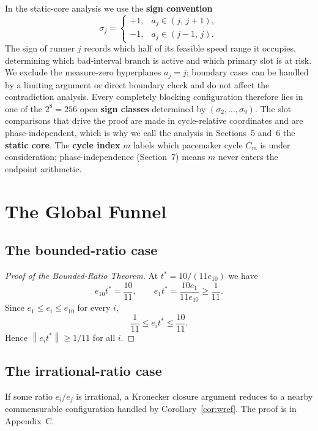 \documentclass[12pt,a4paper]{amsart}
\theoremstyle{definition}
\theoremstyle{remark}
\newcommand{\norm}[1]{\left\|#1\right\|}
\begin{document}
In the static-core analysis we use the \textbf{sign convention}
\[
  \sigma_j =
  \begin{cases}
    +1, & a_j\in(j,\,j+1),\\
    -1, & a_j\in(j-1,\,j).
  \end{cases}
\]
The sign of runner $j$ records which half of its feasible speed range it occupies,
determining which bad-interval branch is active and which primary slot is at risk.
We exclude the measure-zero hyperplanes $a_j=j$; boundary cases can be handled by a
limiting argument or direct boundary check and do not affect the contradiction analysis.
Every completely blocking configuration therefore lies in one of the $2^8=256$ open
\textbf{sign classes} determined by $(\sigma_2,\ldots,\sigma_9)$.
The slot comparisons that drive the proof are made in cycle-relative coordinates and are
phase-independent, which is why we call the analysis in Sections~5 and~6 the \textbf{static core}. The \textbf{cycle index} $m$ labels which pacemaker cycle $C_m$ is under consideration;
phase-independence (Section~7) means $m$ never enters the endpoint arithmetic.

\section{The Global Funnel}

\subsection{The bounded-ratio case}

\begin{proof}[Proof of the Bounded-Ratio Theorem]
At $t^*=10/(11e_{10})$ we have
\[
  e_{10}t^* = \frac{10}{11},\qquad e_1 t^* = \frac{10e_1}{11e_{10}} \ge \frac{1}{11}.
\]
Since $e_1\le e_i\le e_{10}$ for every $i$,
\[
  \frac{1}{11}\le e_i t^*\le \frac{10}{11}.
\]
Hence $\norm{e_i t^*}\ge 1/11$ for all $i$.
\end{proof}

\subsection{The irrational-ratio case}

If some ratio $e_i/e_j$ is irrational, a Kronecker closure argument reduces to a nearby
commensurable configuration handled by Corollary~\ref{cor:wref}. The proof is in
Appendix~C.
\end{document}
